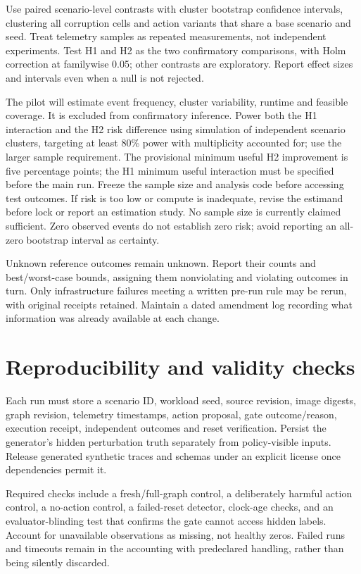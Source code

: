 ﻿\documentclass[sigconf,nonacm]{acmart}
\begin{document}
Use paired scenario-level contrasts with cluster bootstrap confidence intervals, clustering all corruption cells and action variants that share a base scenario and seed. Treat telemetry samples as repeated measurements, not independent experiments. Test H1 and H2 as the two confirmatory comparisons, with Holm correction at familywise 0.05; other contrasts are exploratory. Report effect sizes and intervals even when a null is not rejected.

The pilot will estimate event frequency, cluster variability, runtime and feasible coverage. It is excluded from confirmatory inference. Power both the H1 interaction and the H2 risk difference using simulation of independent scenario clusters, targeting at least 80\% power with multiplicity accounted for; use the larger sample requirement. The provisional minimum useful H2 improvement is five percentage points; the H1 minimum useful interaction must be specified before the main run. Freeze the sample size and analysis code before accessing test outcomes. If risk is too low or compute is inadequate, revise the estimand before lock or report an estimation study. No sample size is currently claimed sufficient. Zero observed events do not establish zero risk; avoid reporting an all-zero bootstrap interval as certainty.

Unknown reference outcomes remain unknown. Report their counts and best/worst-case bounds, assigning them nonviolating and violating outcomes in turn. Only infrastructure failures meeting a written pre-run rule may be rerun, with original receipts retained. Maintain a dated amendment log recording what information was already available at each change.

\section{Reproducibility and validity checks}
Each run must store a scenario ID, workload seed, source revision, image digests, graph revision, telemetry timestamps, action proposal, gate outcome/reason, execution receipt, independent outcomes and reset verification. Persist the generator's hidden perturbation truth separately from policy-visible inputs. Release generated synthetic traces and schemas under an explicit license once dependencies permit it.

Required checks include a fresh/full-graph control, a deliberately harmful action control, a no-action control, a failed-reset detector, clock-age checks, and an evaluator-blinding test that confirms the gate cannot access hidden labels. Account for unavailable observations as missing, not healthy zeros. Failed runs and timeouts remain in the accounting with predeclared handling, rather than being silently discarded.
\end{document}
